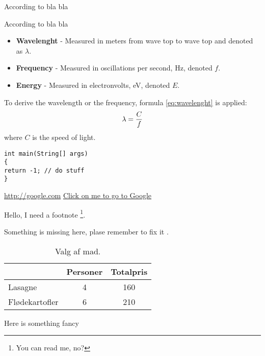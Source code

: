 According to bla bla \citep{ip_book} %

According to bla bla \citet{ip_book} %

\begin{itemize}
\item \textbf{Wavelenght} - Measured in meters from wave top to wave top and denoted as $\lambda$.
\item \textbf{Frequency} - Measured in oscillations per second, Hz, denoted $f$.
\item \textbf{Energy} - Measured in electronvolts, eV, denoted $E$.
\end{itemize}

To derive the wavelength or the frequency, formula \ref{eq:wavelenght} is applied:
\begin{align}
\centering 
\lambda = \frac{C}{f}
\label{eq:wavelenght} 
\end{align}
where {$C$} is the speed of light.

\begin{lstlisting}
int main(String[] args)
{
return -1; // do stuff
}

\end{lstlisting}

%

\url{http://google.com}\linebreak
\href{http://google.com}{Click on me to go to Google}

Hello, I need a footnote \footnote[0]{You can read me, no?}.

Something is missing here, plase remember to fix it .

\begin{table}[htbp]
\centering
\begin{tabular}{|l|c|c|}
\hline
& Personer
& Totalpris \\\hline
Lasagne
& 4
& 160
\\\hline
Flødekartofler
& 6
& 210
\\\hline
\end{tabular}
\caption{Valg af mad.}
\label{tab:mums}
\end{table}

\begin{fancyquotes}
Here is something fancy
\end{fancyquotes}